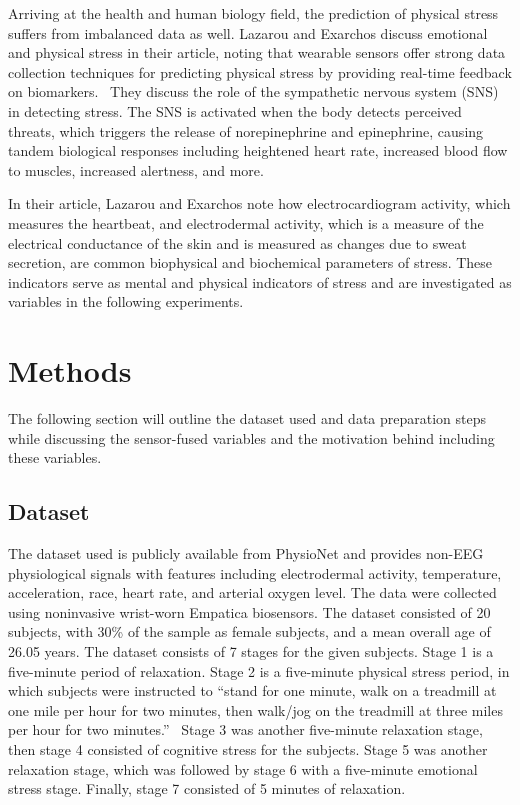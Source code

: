 \documentclass{article}
\begin{document}
Arriving at the health and human biology field, the prediction of physical stress suffers from imbalanced data as well. Lazarou and Exarchos discuss emotional and physical stress in their article, noting that wearable sensors offer strong data collection techniques for predicting physical stress by providing real-time feedback on biomarkers.~\cite{Lazarou2024} They discuss the role of the sympathetic nervous system (SNS) in detecting stress. The SNS is activated when the body detects perceived threats, which triggers the release of norepinephrine and epinephrine, causing tandem biological responses including heightened heart rate, increased blood flow to muscles, increased alertness, and more. 

In their article, Lazarou and Exarchos note how electrocardiogram activity, which measures the heartbeat, and electrodermal activity, which is a measure of the electrical conductance of the skin and is measured as changes due to sweat secretion, are common biophysical and biochemical parameters of stress. These indicators serve as mental and physical indicators of stress and are investigated as variables in the following experiments. 

\section{Methods}
The following section will outline the dataset used and data preparation steps while discussing the sensor-fused variables and the motivation behind including these variables. 

\subsection{Dataset}
The dataset used is publicly available from PhysioNet and provides non-EEG physiological signals with features including electrodermal activity, temperature, acceleration, race, heart rate, and arterial oxygen level. The data were collected using noninvasive wrist-worn Empatica biosensors. The dataset consisted of 20 subjects, with 30\% of the sample as female subjects, and a mean overall age of 26.05 years. The dataset consists of 7 stages for the given subjects. Stage 1 is a five-minute period of relaxation. Stage 2 is a five-minute physical stress period, in which subjects were instructed to “stand for one minute, walk on a treadmill at one mile per hour for two minutes, then walk/jog on the treadmill at three miles per hour for two minutes.”~\cite{Birjandtalab2016} Stage 3 was another five-minute relaxation stage, then stage 4 consisted of cognitive stress for the subjects. Stage 5 was another relaxation stage, which was followed by stage 6 with a five-minute emotional stress stage. Finally, stage 7 consisted of 5 minutes of relaxation. 
\end{document}
